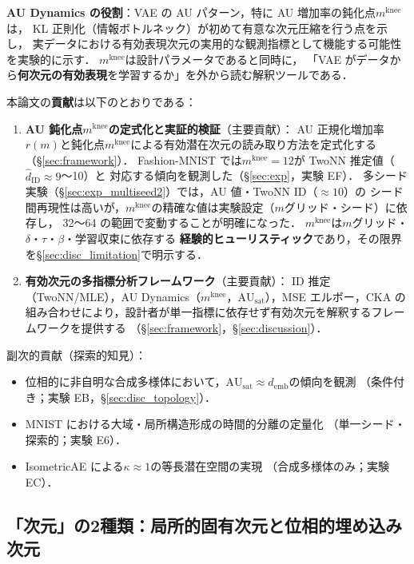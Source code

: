 \documentclass[11pt,a4paper]{jsarticle}
\newcommand{\kap}{\kappa}
\newcommand{\AUsat}{\mathrm{AU}_{\mathrm{sat}}}
\newcommand{\mknee}{m^{\mathrm{knee}}}
\newcommand{\demb}{d_{\mathrm{emb}}}
\begin{document}
\textbf{AU Dynamics の役割}：VAE の AU パターン，特に AU 増加率の鈍化点$\mknee$は，
KL 正則化（情報ボトルネック\cite{tishby2000ib}）が初めて有意な次元圧縮を行う点を示し，
実データにおける有効表現次元の実用的な観測指標として機能する可能性を実験的に示す．
$\mknee$は設計パラメータであると同時に，
「VAE がデータから\textbf{何次元の有効表現}を学習するか」を外から読む解釈ツールである．

本論文の\textbf{貢献}は以下のとおりである：
\begin{enumerate}
  \item \textbf{AU 鈍化点$\mknee$の定式化と実証的検証}（主要貢献）：
        AU 正規化増加率$r(m)$と鈍化点$\mknee$による有効潜在次元の読み取り方法を定式化する
        （§\ref{sec:framework}）．
        Fashion-MNIST では$\mknee = 12$が TwoNN 推定値（$\hat{d}_\mathrm{ID} \approx 9$〜10）と
        対応する傾向を観測した（§\ref{sec:exp}，実験 EF）．
        多シード実験（§\ref{sec:exp_multiseed2}）では，AU 値・TwoNN ID（$\approx 10$）の
        シード間再現性は高いが，$\mknee$の精確な値は実験設定（$m$グリッド・シード）に依存し，
        32〜64 の範囲で変動することが明確になった．
        $\mknee$は$m$グリッド・$\delta$・$\tau$・$\beta$・学習収束に依存する
        \textbf{経験的ヒューリスティック}であり，その限界を§\ref{sec:disc_limitation}で明示する．
  \item \textbf{有効次元の多指標分析フレームワーク}（主要貢献）：
        ID 推定（TwoNN/MLE），AU Dynamics（$\mknee$，$\AUsat$），MSE エルボー，CKA の
        組み合わせにより，設計者が単一指標に依存せず有効次元を解釈するフレームワークを提供する
        （§\ref{sec:framework}，§\ref{sec:discussion}）．
\end{enumerate}

副次的貢献（探索的知見）：
\begin{itemize}
  \item 位相的に非自明な合成多様体において，$\AUsat \approx \demb$の傾向を観測
        （条件付き；実験 EB，§\ref{sec:disc_topology}）．
  \item MNIST における大域・局所構造形成の時間的分離の定量化
        （単一シード・探索的；実験 E6）．
  \item IsometricAE による$\kap \approx 1$の等長潜在空間の実現
        （合成多様体のみ；実験 EC）．
\end{itemize}

\subsection{「次元」の2種類：局所的固有次元と位相的埋め込み次元}\label{sec:intro_dim}
\end{document}
